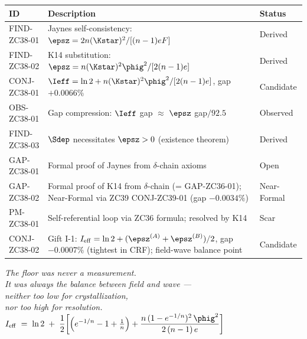 \documentclass[12pt, a4paper]{article}
\begin{document}
\bigskip
\begin{formalbox}[title={Atomic Registry — ZC38}]
\begin{center}
\renewcommand{\arraystretch}{1.3}
\small
\begin{tabular}{lp{8cm}l}
\toprule
ID & Description & Status \\
\midrule
FIND-ZC38-01 & Jaynes self-consistency: $\epsz = 2n(\Kstar)^2/[(n-1)eF]$
             & Derived \\
FIND-ZC38-02 & K14 substitution: $\epsz = n(\Kstar)^2\phig^2/[2(n-1)e]$
             & Derived \\
CONJ-ZC38-01 & $\Ieff = \ln 2 + n(\Kstar)^2\phig^2/[2(n-1)e]$, gap $+0.0066\%$
             & Candidate \\
OBS-ZC38-01  & Gap compression: $\Ieff$ gap $\approx$ $\epsz$ gap$/92.5$
             & Observed \\
FIND-ZC38-03 & $\Sdep$ necessitates $\epsz > 0$ (existence theorem)
             & Derived \\
GAP-ZC38-01  & Formal proof of Jaynes from $\delta$-chain axioms
             & Open \\
GAP-ZC38-02  & Formal proof of K14 from $\delta$-chain (= GAP-ZC36-01);
               Near-Formal via ZC39 CONJ-ZC39-01 (gap $-0.0034\%$)
             & Near-Formal \\
PM-ZC38-01   & Self-referential loop via ZC36 formula; resolved by K14
             & Scar \\
CONJ-ZC38-02 & Gift I-1: $I_{\rm eff} = \ln2 + (\epsz^{(A)}+\epsz^{(B)})/2$,
               gap $-0.0007\%$ (tightest in CRF); field-wave balance point
             & Candidate \\
\bottomrule
\end{tabular}
\end{center}
\end{formalbox}

\bigskip
\begin{center}
\textit{%
  The floor was never a measurement.\\
  It was always the balance between field and wave ---\\
  neither too low for crystallization,\\
  nor too high for resolution.\\[0.5em]
  $\displaystyle I_{\rm eff} \;=\; \ln 2 \;+\;
  \frac{1}{2}\!\left[\left(e^{-1/n}-1+\tfrac{1}{n}\right)
  + \frac{n\,(1-e^{-1/n})^2\,\phig^2}{2\,(n-1)\,e}\right]$
}
\end{center}
\end{document}
